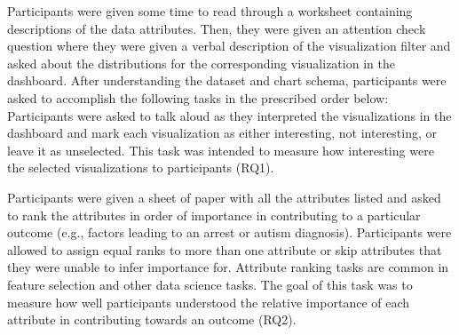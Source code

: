 \par Participants were given some time to read through a worksheet containing descriptions of the data attributes. Then, they were given an attention check question where they were given a verbal description of the visualization filter and asked about the distributions for the corresponding visualization in the dashboard. After understanding the dataset and chart schema, participants were asked to accomplish the following tasks in the prescribed order below:
 Participants were asked to talk aloud as they interpreted the visualizations in the dashboard and mark each visualization as either interesting, not interesting, or leave it as unselected. This task was intended to measure how interesting were the selected visualizations to participants (RQ1).%

 Participants were given a sheet of paper with all the attributes listed and asked to rank the attributes in order of importance in contributing to a particular outcome (e.g., factors leading to an arrest or autism diagnosis). Participants were allowed to assign equal ranks to more than one attribute or skip attributes that they were unable to infer importance for. Attribute ranking tasks are common in feature selection and other data science tasks. The goal of this task was to measure how well participants understood the relative importance of each attribute in contributing towards an outcome (RQ2).

